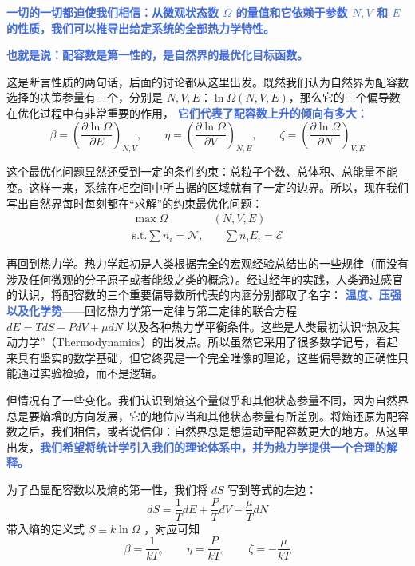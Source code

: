 \textcolor{RoyalBlue}{\textbf{\kaishu 一切的一切都迫使我们相信：从微观状态数 $\Omega$ 的量值和它依赖于参数 $N,V$ 和 $E$ 的性质，我们可以推导出给定系统的全部热力学特性。}}

\textcolor{RoyalBlue}{\textbf{\kaishu 也就是说：配容数是第一性的，是自然界的最优化目标函数。}}

这是断言性质的两句话，后面的讨论都从这里出发。既然我们认为自然界为配容数选择的决策参量有三个，分别是 $N,V,E$：$\ln\Omega(N,V,E)$，那么它的三个偏导数在优化过程中有非常重要的作用， \textcolor{RoyalBlue}{\textbf{\kaishu 它们代表了配容数上升的倾向有多大：}} 
\begin{equation}
    \beta = \left(\frac{\partial \ln\Omega}{\partial E}\right)_{N,V},\quad\quad \eta = \left(\frac{\partial \ln\Omega}{\partial V}\right)_{N,E},\quad\quad \zeta = \left(\frac{\partial \ln\Omega}{\partial N}\right)_{V,E}
\end{equation}

这个最优化问题显然还受到一定的条件约束：总粒子个数、总体积、总能量不能变。这样一来，系综在相空间中所占据的区域就有了一定的边界。所以，现在我们写出自然界每时每刻都在“求解”的约束最优化问题：
\begin{equation}\label{equ:optimizeI}
    \begin{split}
        \max \Omega&(N,V,E)\\
        \text{s.t.}\sum n_i = \mathcal{N},&\quad\sum n_iE_i = \mathcal{E}
    \end{split}
\end{equation}

再回到热力学。热力学起初是人类根据完全的宏观经验总结出的一些规律（而没有涉及任何微观的分子原子或者能级之类的概念）。经过经年的实践，人类通过感官的认识，将配容数的三个重要偏导数所代表的内涵分别都取了名字： \textcolor{RoyalBlue}{\textbf{\kaishu 温度、压强以及化学势}}——回忆热力学第一定律与第二定律的联合方程 $dE = TdS - PdV+ \mu dN$ 以及各种热力学平衡条件。这些是人类最初认识“热及其动力学”（Thermodynamics）的出发点。所以虽然它采用了很多数学记号，看起来具有坚实的数学基础，但它终究是一个完全唯像的理论，这些偏导数的正确性只能通过实验检验，而不是逻辑。

但情况有了一些变化。我们认识到熵这个量似乎和其他状态参量不同，因为自然界总是要熵增的方向发展，它的地位应当和其他状态参量有所差别。将熵还原为配容数之后，我们相信，或者说信仰：自然界总是想运动至配容数更大的地方。从这里出发，\textcolor{RoyalBlue}{\textbf{\kaishu 我们希望将统计学引入我们的理论体系中，并为热力学提供一个合理的解释。}} 

为了凸显配容数以及熵的第一性，我们将 $dS$ 写到等式的左边：
\begin{equation}
    dS = \frac{1}{T} dE + \frac{P}{T} dV - \frac{\mu}{T} dN
\end{equation}
带入熵的定义式 $S \equiv k\ln \Omega$ ，对应可知
\begin{equation}
    \beta = \frac{1}{kT} ,\quad\quad \eta = \frac{P}{kT} ,\quad\quad \zeta = -\frac{\mu}{kT} 
\end{equation}

